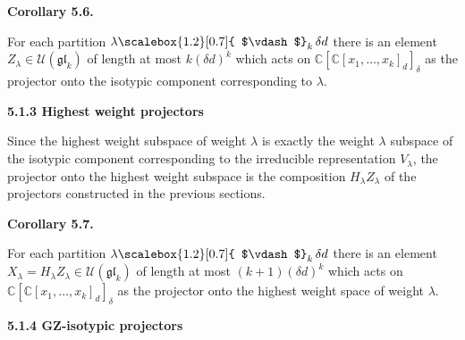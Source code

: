 \par\medskip\noindent\textbf{Corollary 5.6.}\par



For each partition $\lambda\mathchoice{\scalebox{1.2}[0.7]{ $\vdash$}_{k}\,}{\scalebox{1.2}[0.7]{ $\vdash$}_{k}\,}{\scalebox{0.7}{\scalebox{1.2}[0.7]{$\vdash$}}_{k}\,}{\scalebox{0.5}{\scalebox{1.2}[0.7]{$\vdash$}}_{k}\,}{\delta d}$ there is an element $Z_{\lambda}\in\mathcal{U}(\mathfrak{gl}_{k})$ of length at most $k(\delta d)^{k}$ which acts on $\mathbb{C}[\mathbb{C}[x_{1},\ldots,x_{k}]_{d}]_{\delta}$ as the projector onto the isotypic component corresponding to $\lambda$.







\par\medskip\noindent\textbf{5.1.3 Highest weight projectors}\par




Since the highest weight subspace of weight $\lambda$ is exactly the weight $\lambda$ subspace of the isotypic component corresponding to the irreducible representation $V_{\lambda}$, the projector onto the highest weight subspace is the composition $H_{\lambda}Z_{\lambda}$ of the projectors constructed in the previous sections.





\par\medskip\noindent\textbf{Corollary 5.7.}\par



For each partition $\lambda\mathchoice{\scalebox{1.2}[0.7]{ $\vdash$}_{k}\,}{\scalebox{1.2}[0.7]{ $\vdash$}_{k}\,}{\scalebox{0.7}{\scalebox{1.2}[0.7]{$\vdash$}}_{k}\,}{\scalebox{0.5}{\scalebox{1.2}[0.7]{$\vdash$}}_{k}\,}{\delta d}$ there is an element $X_{\lambda}=H_{\lambda}Z_{\lambda}\in\mathcal{U}(\mathfrak{gl}_{k})$ of length at most $(k+1)(\delta d)^{k}$ which acts on $\mathbb{C}[\mathbb{C}[x_{1},\ldots,x_{k}]_{d}]_{\delta}$ as the projector onto the highest weight space of weight $\lambda$.







\par\medskip\noindent\textbf{5.1.4 GZ-isotypic projectors}\par




